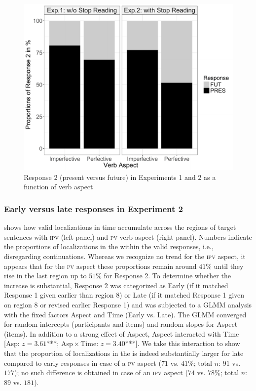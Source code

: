 \documentclass[output=paper,colorlinks,citecolor=brown,newtxmath,hidelinks]{langscibook}
\begin{document}
\begin{figure}
\includegraphics[height=.4\textheight]{figures/06gattnar_etal_fig1.pdf}
\caption{Response 2 (present versus future) in Experiments 1 and 2 as a function of verb aspect}
\label{fig:eins}
\end{figure}

\subsubsection{Early versus late responses in Experiment 2}

 shows how valid localizations in time accumulate across the regions of target sentences with \textsc{ipv} (left panel) and \textsc{pv} verb aspect (right panel). Numbers indicate the proportions of localizations in the  within the valid responses, i.e., disregarding continuations. Whereas we recognize no trend for the \textsc{ipv} aspect, it appears that for the \textsc{pv} aspect these proportions remain around $41\%$ until they rise in the last region up to $51\%$ for Response 2. To determine whether the increase is substantial, Response 2 was categorized as Early (if it matched Response 1 given earlier than region 8) or Late (if it matched Response 1 given on region 8 or revised earlier Response 1) and was subjected to a GLMM analysis with the fixed factors Aspect and Time (Early vs. Late). The GLMM converged for random intercepts (participants and items) and random slopes for Aspect (items). In addition to a strong effect of Aspect, Aspect interacted with Time [Asp: $z=3.61$\textup{***}; Asp${}\times{}$Time: $z=3.40$\textup{***}]. We take this interaction to show that the proportion of localizations in the  is indeed substantially larger for late compared to early responses in case of a \textsc{pv} aspect ($71$ vs. $41\%$; total $n$: $91$ vs. $177$); no such difference is obtained in case of an \textsc{ipv} aspect ($74$ vs. $78\%$; total $n$: $89$ vs. $181$).
\end{document}
